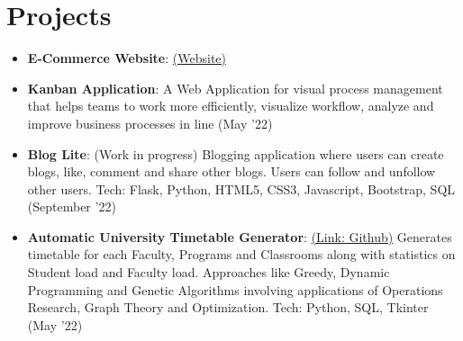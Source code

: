 \documentclass[a4paper,20pt]{article}
\newcommand{\resumeItem}[2]{
  \item\small{
    \textbf{#1}{: #2 \vspace{-2pt}}
  }
}
\newcommand{\resumeSubItem}[2]{\resumeItem{#1}{#2}\vspace{-3pt}}
\newcommand{\resumeSubHeadingListStart}{\begin{itemize}[leftmargin=*]}
\newcommand{\resumeSubHeadingListEnd}{\end{itemize}}
\begin{document}
\section{Projects}
\resumeSubHeadingListStart
\resumeSubItem{E-Commerce Website}{\href{https://challenge-30e97.web.app/}{(Website)}}{Made clone of Amazon using Firebase, ReactJS, HTML5, CSS3, JavaScript}
\vspace{1pt}
\resumeSubItem{Kanban Application}{A Web Application for visual process management that helps teams to work more efficiently, visualize workflow, analyze and improve business processes in line (May '22)}
\vspace{1pt}
\resumeSubItem{Blog Lite}{(Work in progress) Blogging application where users can create blogs, like, comment and share other blogs. Users can follow and unfollow other users. Tech: Flask, Python, HTML5, CSS3, Javascript, Bootstrap, SQL (September '22)}
\resumeSubItem{Automatic University Timetable Generator}{\href{https://github.com/mayankwalia/TimeTableGenerator}{(Link: Github)} Generates timetable for each Faculty, Programs and Classrooms along with statistics on Student load and Faculty load. Approaches like Greedy, Dynamic Programming and Genetic Algorithms involving applications of Operations Research, Graph Theory and Optimization. Tech: Python, SQL, Tkinter (May '22)}
\vspace{2pt}
\resumeSubHeadingListEnd
\end{document}
